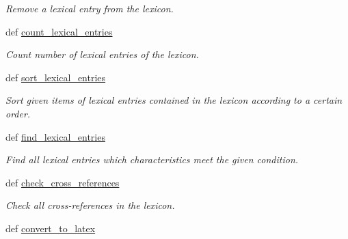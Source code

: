 \begin{DoxyCompactItemize}
\begin{DoxyCompactList}\small\item\em Remove a lexical entry from the lexicon. \end{DoxyCompactList}\item 
def \hyperlink{classlmf_1_1src_1_1core_1_1lexicon_1_1_lexicon_a0e5b3626dcbdbf4ccfda39be46b9e09f}{count\+\_\+lexical\+\_\+entries}
\begin{DoxyCompactList}\small\item\em Count number of lexical entries of the lexicon. \end{DoxyCompactList}\item 
def \hyperlink{classlmf_1_1src_1_1core_1_1lexicon_1_1_lexicon_a934a9edcae2b33eb5e7b9ce61cd0234a}{sort\+\_\+lexical\+\_\+entries}
\begin{DoxyCompactList}\small\item\em Sort given items of lexical entries contained in the lexicon according to a certain order. \end{DoxyCompactList}\item 
def \hyperlink{classlmf_1_1src_1_1core_1_1lexicon_1_1_lexicon_a8bb0aef3699fd6cbe10a06e7f2e07975}{find\+\_\+lexical\+\_\+entries}
\begin{DoxyCompactList}\small\item\em Find all lexical entries which characteristics meet the given condition. \end{DoxyCompactList}\item 
def \hyperlink{classlmf_1_1src_1_1core_1_1lexicon_1_1_lexicon_a6dd757b26a4579e8ca167ba2fbd55150}{check\+\_\+cross\+\_\+references}
\begin{DoxyCompactList}\small\item\em Check all cross-\/references in the lexicon. \end{DoxyCompactList}\item 
def \hyperlink{classlmf_1_1src_1_1core_1_1lexicon_1_1_lexicon_ad47f7c9a54bea805ede556c488ab2a1d}{convert\+\_\+to\+\_\+latex}
\end{DoxyCompactItemize}
